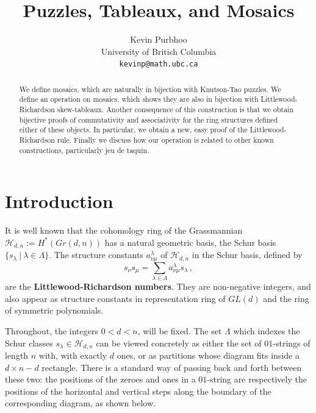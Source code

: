 \documentclass[12pt]{article}
\title{Puzzles, Tableaux, and Mosaics}
\author{Kevin Purbhoo  \\
University of British Columbia\\
{\normalsize \tt kevinp@math.ubc.ca}}
\newcommand{\ringH}{\mathcal{H}_{d,n}}
\begin{document}
\maketitle

\begin{abstract}
We define mosaics, which are naturally in bijection with Knutson-Tao
puzzles.  We define an operation on mosaics, which shows they are also
in bijection with Littlewood-Richardson skew-tableaux. Another consequence 
of this construction
is that we obtain bijective proofs of commutativity and associativity
for the ring structures 
defined either
of these objects.  In particular, we obtain a new, easy proof of the 
Littlewood-Richardson rule.
Finally we discuss how our operation is related to other known
constructions, particularly jeu de taquin.
\end{abstract}

\section{Introduction}
\label{sec:intro}

It is well known that the cohomology ring of the Grassmannian 
$\ringH := H^*(Gr(d,n))$ has a natural geometric basis, the 
Schur basis $\{s_\lambda\ |\ \lambda \in \Lambda\}$.  
The structure constants $a_{\nu \mu}^\lambda$ of $\ringH$
in the Schur basis, defined by
$$s_\nu s_\mu = \sum_{\lambda \in \Lambda}a_{\nu \mu}^\lambda s_\lambda\,,$$
are the {\bf Littlewood-Richardson numbers}.  They are non-negative
integers, and also appear
as structure constants in representation ring of $GL(d)$ and the ring of
symmetric polynomials.

Throughout, the integers $0 < d < n$, will be fixed.
The set $\Lambda$ which indexes
the Schur classes $s_\lambda \in \ringH$ can be viewed concretely as either 
the set of $01$-strings of length $n$ with, with exactly $d$ ones,
or as partitions whose diagram fits inside a $d \times n{-}d$ rectangle.
There is a standard way of passing back and forth between these
two: the positions of the zeroes and ones in a $01$-string are respectively
the positions of the horizontal and vertical steps along the boundary
of the corresponding diagram, as shown below. \\
\centerline{}
\end{document}
